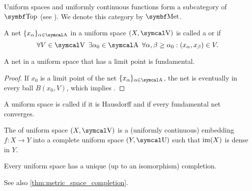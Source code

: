 \begin{definition}\label{def:category_of_uniform_spaces}
  Uniform spaces and uniformly continuous functions form a subcategory of \( \Cat{Top} \) (see ). We denote this category by \( \Cat{Met} \).
\end{definition}

\begin{definition}\label{def:fundamental_net}
  A net \( \{ x_\al \}_{\al \in \CA} \) in a uniform space \( (X, \CV) \) is called a  or  if
  \begin{equation*}
    \forall V \in \CV \ \exists \al_0 \in \CA \ \forall \al, \beta \geq \al_0 : (x_\al, x_\beta) \in V.
  \end{equation*}
\end{definition}

\begin{lemma}\label{thm:convergent_net_is_fundamental}
  A net in a uniform space that has a limit point is fundamental.
\end{lemma}
\begin{proof}
  If \( x_0 \) is a limit point of the net \( \{ x_\al \}_{\al \in \CA} \), the net is eventually in every ball \( B(x_0, V) \), which implies .
\end{proof}

\begin{definition}\label{def:complete_uniform_space}\cite[446]{Engelking1989}
  A uniform space is called  if it is Hausdorff and if every fundamental net converges.

  The  of uniform space \( (X, \CV) \) is a (uniformly continuous) embedding \( f: X \to Y \) into a complete uniform space \( (Y, \CU) \) such that \( \operatorname{im}(X) \) is dense in \( Y \).
\end{definition}

\begin{theorem}\label{thm:uniform_space_completion}\cite[theorem 8.3.12]{Engelking1989}
  Every uniform space has a unique (up to an isomorphism) completion.

  See also \cref{thm:metric_space_completion}.
\end{theorem}

